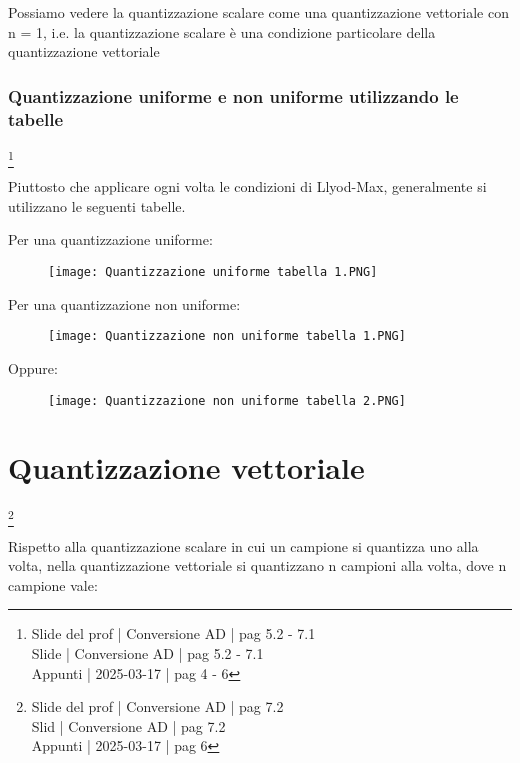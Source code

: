 \begin{tcolorbox}
    Possiamo vedere la quantizzazione scalare come una quantizzazione vettoriale con n = 1, 
    i.e. la quantizzazione scalare è una condizione particolare della quantizzazione vettoriale    
\end{tcolorbox}

\newpage 

\subsubsection{Quantizzazione uniforme e non uniforme utilizzando le tabelle}
\footnote{Slide del prof | Conversione AD | pag 5.2 - 7.1\\  
Slide | Conversione AD | pag 5.2 - 7.1\\
Appunti | 2025-03-17 | pag 4 - 6
}

Piuttosto che applicare ogni volta le condizioni di Llyod-Max, 
generalmente si utilizzano le seguenti tabelle. \newline 

Per una quantizzazione uniforme: 

\begin{figure}[h]
    \centering
    \texttt{[image: Quantizzazione uniforme tabella 1.PNG]}
\end{figure}

Per una quantizzazione non uniforme: 

\begin{figure}[h]
    \centering
    \texttt{[image: Quantizzazione non uniforme tabella 1.PNG]}
\end{figure}

\newpage 

Oppure: 

\begin{figure}[h]
    \centering
    \texttt{[image: Quantizzazione non uniforme tabella 2.PNG]}
\end{figure}

\newpage 

\section{Quantizzazione vettoriale}
\footnote{Slide del prof | Conversione AD | pag 7.2\\  
Slid | Conversione AD | pag 7.2\\
Appunti | 2025-03-17 | pag 6
}

Rispetto alla quantizzazione scalare in cui un campione si quantizza uno alla volta, 
nella quantizzazione vettoriale si quantizzano n campioni alla volta, dove n campione vale: 


